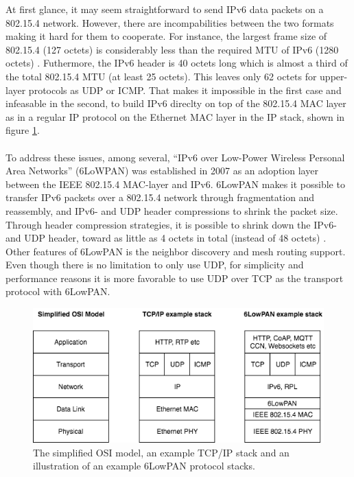 At first glance, it may seem straightforward to send IPv6 data packets on a 802.15.4 network. However, there are incompabilities between the two formats making it hard for them to cooperate. For instance, the largest frame size of 802.15.4 (127 octets) is considerably less than the required MTU of IPv6 (1280 octets) \cite{rfc4944}. Futhermore, the IPv6 header is 40 octets long which is almost a third of the total 802.15.4 MTU (at least 25 octets). This leaves only 62 octets for upper-layer protocols as UDP or ICMP. That makes it impossible in the first case and infeasable in the second, to build IPv6 direclty on top of the 802.15.4 MAC layer as in a regular IP protocol on the Ethernet MAC layer in the IP stack, shown in figure \ref{fig:ip-6lowpan-stack}.\\\\
To address these issues, among several, ``IPv6 over Low-Power Wireless Personal Area Networks'' (6LoWPAN) was established in 2007 as an adoption layer between the IEEE 802.15.4 MAC-layer and IPv6. 6LowPAN makes it possible to transfer IPv6 packets over a 802.15.4 network through fragmentation and reassembly, and IPv6- and UDP header compressions to shrink the packet size. Through header compression strategies, it is possible to shrink down the IPv6- and UDP header, toward as little as 4 octets in total (instead of 48 octets) \cite{rfc4944}. Other features of 6LowPAN is the neighbor discovery and mesh routing support. Even though there is no limitation to only use UDP, for simplicity and performance reasons it is more favorable to use UDP over TCP as the transport protocol with 6LowPAN.


\begin{figure}
	\includegraphics[width=\textwidth]{figures/6lowpan-own.png}
	\caption{The simplified OSI model, an example TCP/IP stack and an illustration of an example 6LowPAN protocol stacks.}
	\label{fig:ip-6lowpan-stack}
\end{figure}

